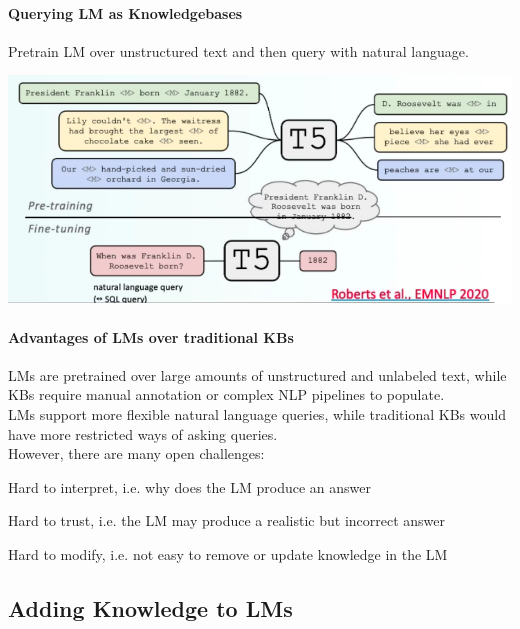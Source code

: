 \documentclass[10pt]{report}
\begin{document}
\paragraph{Querying LM as Knowledgebases} Pretrain LM over unstructured  text and then query with natural language.
\begin{center}
	\includegraphics[scale=0.5]{105.png}
\end{center}
\paragraph{Advantages of LMs over traditional KBs} LMs are pretrained over large amounts of unstructured and unlabeled text, while KBs require manual annotation or complex NLP pipelines to populate.\\
LMs support more flexible natural language queries, while traditional KBs would have more restricted ways of asking queries.\\
However, there are many open challenges:
\begin{list}{}{}
	\item Hard to interpret, i.e. why does the LM produce an answer
	\item Hard to trust, i.e. the LM may produce a realistic but incorrect answer
	\item Hard to modify, i.e. not easy to remove or update knowledge in the LM
\end{list}
\subsection{Adding Knowledge to LMs}
\end{document}
